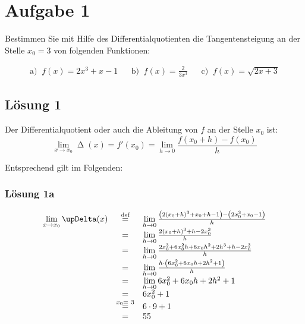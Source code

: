 \documentclass[main.tex]{subfiles}
\begin{document}
\section{Aufgabe 1}
Bestimmen Sie mit Hilfe des Differentialquotienten die Tangentensteigung an der Stelle $x_0 = 3$ von folgenden Funktionen:

\begin{align*}
    \text{a) }\ f(x) = 2x^3+x-1
    & &
    \text{b) }\ f(x) = \frac{2}{3x^3}
    & &
    \text{c) }\ f(x) = \sqrt{2x+3}
\end{align*}

\subsection{Lösung 1}

Der Differentialquotient oder auch die Ableitung von $f$ an der Stelle $x_{0}$ ist:
\begin{equation*}
    \lim _{x\rightarrow x_{0}} \upDelta ( x) =f'( x_{0}) =\lim _{h\rightarrow 0}\frac{f( x_{0} +h) -f( x_{0})}{h}
\end{equation*}

Entsprechend gilt im Folgenden:

\subsubsection*{Lösung 1a}
\begin{equation*}
    \begin{array}{ c c l }
    \lim\limits _{x\rightarrow x_{0}} \upDelta ( x) & \eqdef  & \lim\limits _{h\rightarrow 0}\frac{\left( 2( x_{0} +h)^{3} +x_{0} +h-1\right) -\left( 2x_{0}^{3} +x_{0} -1\right)}{h}\\
    & = & \lim\limits _{h\rightarrow 0}\frac{2( x_{0} +h)^{3} +h-2x_{0}^{3}}{h}\\
    & = & \lim\limits _{h\rightarrow 0}\frac{2x_{0}^{3} +6x_{0}^{2} h+6x_{0} h^{2} +2h^{3} +h-2x_{0}^{3}}{h}\\
    & = & \lim\limits _{h\rightarrow 0}\frac{h\cdotp \left( 6x_{0}^{2} +6x_{0} h +2h^{2} +1\right)}{h}\\
    & = & \lim\limits _{h\rightarrow 0} 6x_{0}^{2} +6x_{0} h +2h^{2} +1\\
    & = & 6x_{0}^{2} +1\\
    & \overset{x_{0} =\ 3}{=} & 6\cdotp 9+1\\
    & = & 55
    \end{array}
\end{equation*}
\end{document}
